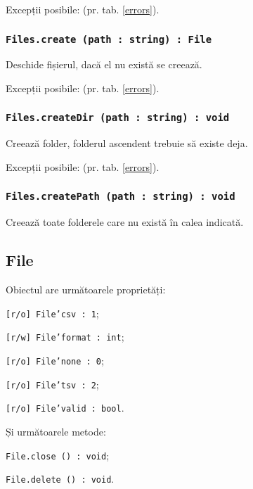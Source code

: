 Excepții posibile:  (pr. tab. \ref{errors}).

\subsubsection{\texttt{Files.create (path : string) : File}}

Deschide fișierul, dacă el nu există se creează.

Excepții posibile:  (pr. tab. \ref{errors}).

\subsubsection{\texttt{Files.createDir (path : string) : void}}

Creează folder, folderul ascendent trebuie să existe deja.

Excepții posibile:  (pr. tab. \ref{errors}).

\subsubsection{\texttt{Files.createPath (path : string) : void}}

Creează toate folderele care nu există în calea indicată.

\subsection{{\color{orange} File}}

Obiectul \file{} are următoarele proprietăți:
\begin{icItems}
	\item \texttt{[r/o] File'csv : 1};
	\item \texttt{[r/w] File'format : int};
	\item \texttt{[r/o] File'none : 0};
	\item \texttt{[r/o] File'tsv : 2};
	\item \texttt{[r/o] File'valid : bool}.
\end{icItems}

Și următoarele metode:
\begin{icItems}
	\item \texttt{File.close () : void};
	\item \texttt{File.delete () : void}.
\end{icItems}

